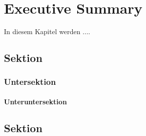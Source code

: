 \chapter{Executive Summary}

In diesem Kapitel werden ....

\section{Sektion}

\blindtext

\subsection{Untersektion}

\subsubsection{Unteruntersektion}

\section{Sektion}
